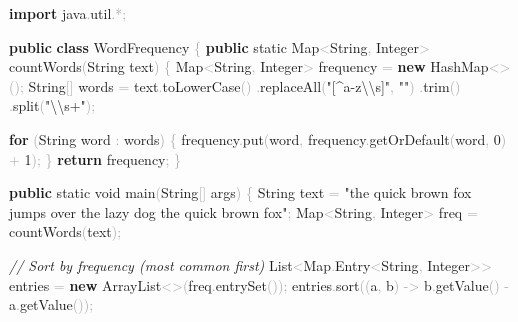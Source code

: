 \documentclass[
  justified,
  openright,
]{tufte-book}
\newcommand{\KeywordTok}[1]{\textcolor{CodeKeyword}{\textbf{#1}}}  %
\newcommand{\StringTok}[1]{\textcolor{CodeString}{#1}}              %
\newcommand{\CommentTok}[1]{\textcolor{CodeComment}{\textit{#1}}}  %
\newcommand{\CodeNumTok}[1]{\textcolor{CodeNumber}{#1}}             %
\newcommand{\CodeFuncTok}[1]{\textcolor{CodeKeyword}{#1}}           %
\newcommand{\CodeTypeTok}[1]{\textcolor{CodeType}{#1}}              %
\newcommand{\CodeAccentTok}[1]{\textcolor{CodeAccent}{#1}}          %
\newcommand{\OperatorTok}[1]{\textcolor{DarkGray}{#1}}              %
\newenvironment{Shaded}{%
  \begin{mdframed}[style=TufteCode]%
}{%
  \end{mdframed}%
}
\begin{document}
\begin{Shaded}
\begin{Highlighting}[]
\KeywordTok{import} \CodeAccentTok{java}\OperatorTok{.}\CodeAccentTok{util}\OperatorTok{.*;}
 
\KeywordTok{public} \KeywordTok{class} WordFrequency \OperatorTok{\{}
    \KeywordTok{public} \CodeTypeTok{static} Map\OperatorTok{\textless{}}String\OperatorTok{,} Integer\OperatorTok{\textgreater{}} \CodeFuncTok{countWords}\OperatorTok{(}String text\OperatorTok{)} \OperatorTok{\{}
        Map\OperatorTok{\textless{}}String\OperatorTok{,} Integer\OperatorTok{\textgreater{}} frequency \OperatorTok{=} \KeywordTok{new} HashMap\OperatorTok{\textless{}\textgreater{}();}
        String\OperatorTok{[]} words \OperatorTok{=} text\OperatorTok{.}\CodeFuncTok{toLowerCase}\OperatorTok{()}
                             \OperatorTok{.}\CodeFuncTok{replaceAll}\OperatorTok{(}\StringTok{"[\^{}a{-}z}\StringTok{\textbackslash{}\textbackslash{}}\StringTok{s]"}\OperatorTok{,} \StringTok{""}\OperatorTok{)}
                             \OperatorTok{.}\CodeFuncTok{trim}\OperatorTok{()}
                             \OperatorTok{.}\CodeFuncTok{split}\OperatorTok{(}\StringTok{"}\StringTok{\textbackslash{}\textbackslash{}}\StringTok{s+"}\OperatorTok{);}
 
        \KeywordTok{for} \OperatorTok{(}String word \OperatorTok{:} words\OperatorTok{)} \OperatorTok{\{}
            frequency\OperatorTok{.}\CodeFuncTok{put}\OperatorTok{(}word\OperatorTok{,} frequency\OperatorTok{.}\CodeFuncTok{getOrDefault}\OperatorTok{(}word\OperatorTok{,} \CodeNumTok{0}\OperatorTok{)} \OperatorTok{+} \CodeNumTok{1}\OperatorTok{);}
        \OperatorTok{\}}
        \KeywordTok{return} frequency\OperatorTok{;}
    \OperatorTok{\}}
 
    \KeywordTok{public} \CodeTypeTok{static} \CodeTypeTok{void} \CodeFuncTok{main}\OperatorTok{(}String\OperatorTok{[]} args\OperatorTok{)} \OperatorTok{\{}
        String text \OperatorTok{=} \StringTok{"the quick brown fox jumps over the lazy dog the quick brown fox"}\OperatorTok{;}
        Map\OperatorTok{\textless{}}String\OperatorTok{,} Integer\OperatorTok{\textgreater{}} freq \OperatorTok{=} \CodeFuncTok{countWords}\OperatorTok{(}text\OperatorTok{);}
 
        \CommentTok{// Sort by frequency (most common first)}
        List\OperatorTok{\textless{}}Map\OperatorTok{.}\CodeFuncTok{Entry}\OperatorTok{\textless{}}String\OperatorTok{,} Integer\OperatorTok{\textgreater{}\textgreater{}} entries \OperatorTok{=} \KeywordTok{new} ArrayList\OperatorTok{\textless{}\textgreater{}(}freq\OperatorTok{.}\CodeFuncTok{entrySet}\OperatorTok{());}
        entries\OperatorTok{.}\CodeFuncTok{sort}\OperatorTok{((}a\OperatorTok{,} b\OperatorTok{)} \OperatorTok{{-}\textgreater{}} b\OperatorTok{.}\CodeFuncTok{getValue}\OperatorTok{()} \OperatorTok{{-}} a\OperatorTok{.}\CodeFuncTok{getValue}\OperatorTok{());}
 

\end{Highlighting}
\end{Shaded}
\end{document}
